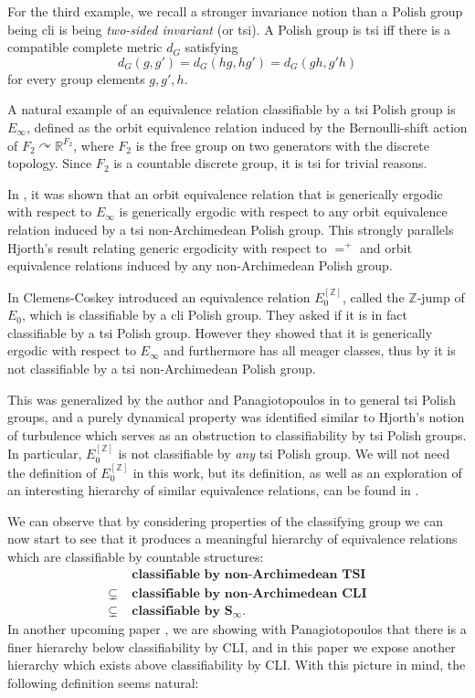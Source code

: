 \documentclass[12pt]{amsart}
\theoremstyle{plain}
\theoremstyle{definition}
\begin{document}
For the third example, we recall a stronger invariance notion than a Polish group being cli is being \emph{two-sided invariant} (or tsi).
A Polish group is tsi iff there is a compatible complete metric $d_G$ satisfying
\[ d_G(g, g') = d_G(hg, hg') = d_G(gh, g'h)\]
for every group elements $g, g', h$.

A natural example of an equivalence relation classifiable by a tsi Polish group is $E_\infty$, defined as the orbit equivalence relation induced by the Bernoulli-shift action of $F_2 \curvearrowright \mathbb{R}^{F_2}$, where $F_2$ is the free group on two generators with the discrete topology.
Since $F_2$ is a countable discrete group, it is tsi for trivial reasons.

In \cite{AllisonTSI}, it was shown that an orbit equivalence relation that is generically ergodic with respect to $E_\infty$ is generically ergodic with respect to any orbit equivalence relation induced by a tsi non-Archimedean Polish group.
This strongly parallels Hjorth's result relating generic ergodicity with respect to $=^+$ and orbit equivalence relations induced by any non-Archimedean Polish group.

In \cite{CC2022} Clemens-Coskey introduced an equivalence relation $E_0^{[\mathbb{Z}]}$, called the $\mathbb{Z}$-jump of $E_0$, which is classifiable by a cli Polish group.
They asked if it is in fact classifiable by a tsi Polish group.
However they showed that it is generically ergodic with respect to $E_\infty$ and furthermore has all meager classes, thus by \cite{AllisonTSI} it is not classifiable by a tsi non-Archimedean Polish group.

This was generalized by the author and Panagiotopoulos in \cite{AllisonPanagio2021} to general tsi Polish groups, and a purely dynamical property was identified similar to Hjorth's notion of turbulence which serves as an obstruction to classifiability by tsi Polish groups.
In particular, $E_0^{[\mathbb{Z}]}$ is not classifiable by \emph{any} tsi Polish group.
We will not need the definition of $E_0^{[\mathbb{Z}]}$ in this work, but its definition, as well as an exploration of an interesting hierarchy of similar equivalence relations, can be found in \cite{CC2022}.

We can observe that by considering properties of the classifying group we can now start to see that it produces a meaningful hierarchy of equivalence relations which are classifiable by countable structures:
\begin{align*}
    &\textbf{classifiable by non-Archimedean TSI}\\
    \subsetneq \; &\textbf{classifiable by non-Archimedean CLI} \\
    \subsetneq \;&\textbf{classifiable by } \mathbf{S_\infty}.
\end{align*}
In another upcoming paper \cite{AllisonPanagio2026}, we are showing with Panagiotopoulos that there is a finer hierarchy below classifiability by CLI, and in this paper we expose another hierarchy which exists above classifiability by CLI.
With this picture in mind, the following definition seems natural:
\end{document}
